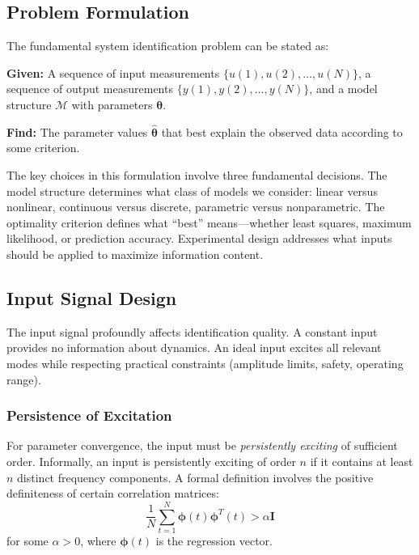 \subsection{Problem Formulation}
\label{subsec:problem_setup}

The fundamental system identification problem can be stated as:

\begin{tcolorbox}[colback=blue!5!white,colframe=blue!75!black,title=System Identification Problem,sharp corners]
\textbf{Given:} A sequence of input measurements $\{u(1), u(2), \ldots, u(N)\}$, a sequence of output measurements $\{y(1), y(2), \ldots, y(N)\}$, and a model structure $\mathcal{M}$ with parameters $\boldsymbol{\theta}$.

\textbf{Find:} The parameter values $\hat{\boldsymbol{\theta}}$ that best explain the observed data according to some criterion.
\end{tcolorbox}

The key choices in this formulation involve three fundamental decisions. The model structure determines what class of models we consider: linear versus nonlinear, continuous versus discrete, parametric versus nonparametric. The optimality criterion defines what ``best'' means---whether least squares, maximum likelihood, or prediction accuracy. Experimental design addresses what inputs should be applied to maximize information content.

\subsection{Input Signal Design}
\label{subsec:input_design}

The input signal profoundly affects identification quality. A constant input provides no information about dynamics. An ideal input excites all relevant modes while respecting practical constraints (amplitude limits, safety, operating range).

\subsubsection{Persistence of Excitation}

For parameter convergence, the input must be \textit{persistently exciting} of sufficient order. Informally, an input is persistently exciting of order $n$ if it contains at least $n$ distinct frequency components. A formal definition involves the positive definiteness of certain correlation matrices:
\begin{equation}
\frac{1}{N} \sum_{t=1}^{N} \boldsymbol{\phi}(t) \boldsymbol{\phi}^T(t) > \alpha \mathbf{I}
\end{equation}
for some $\alpha > 0$, where $\boldsymbol{\phi}(t)$ is the regression vector.

